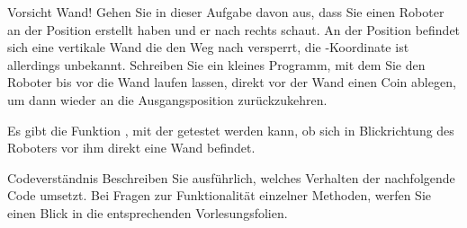 \documentclass{../tuda-exercise}
\begin{document}
  \begin{task}[credit=\stars{2}{3}]{Vorsicht Wand!}
    Gehen Sie in dieser Aufgabe davon aus, dass Sie einen Roboter  an der
    Position  erstellt haben und er nach rechts schaut. An der Position
     befindet sich eine vertikale Wand die den Weg nach 
    versperrt, die -Koordinate ist allerdings unbekannt. Schreiben Sie ein
    kleines Programm, mit dem Sie den Roboter bis vor die Wand laufen lassen, direkt vor der Wand
    einen Coin ablegen, um dann wieder an die Ausgangsposition  zurückzukehren.

    \begin{note}[title=Hinweis:, color=tuda-orange]
      Es gibt die Funktion , mit der getestet werden kann, ob sich in
      Blickrichtung des Roboters vor ihm direkt eine Wand befindet.
    \end{note}

    \begin{solution}
      
    \end{solution}
  \end{task}

  \clearpage

  \begin{task}[credit=\stars{2}{3}]{Codeverständnis}
    Beschreiben Sie ausführlich, welches Verhalten der nachfolgende Code umsetzt. Bei Fragen zur
    Funktionalität einzelner Methoden, werfen Sie einen Blick in die entsprechenden
    Vorlesungsfolien.

    

    \clearpagesolution

    \begin{solution}
      
    \end{solution}
  \end{task}
\end{document}
